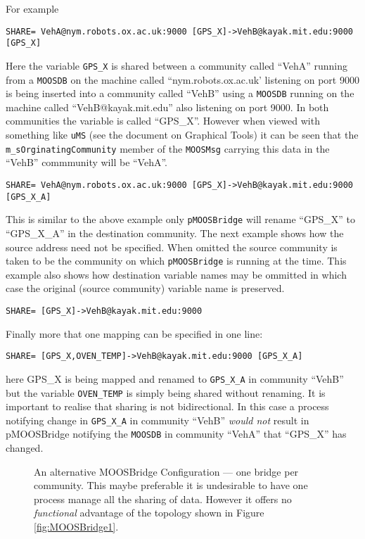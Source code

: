 \documentclass[a4paper,10pt]{article}
\newcommand{\Code}[1]{\texttt{#1} }
\newcommand{\code}[1]{\Code{#1} }
\newcommand{\DB}   {\code{{MOOSDB}}}
\begin{document}
For example\\
\begin{verbatim}
SHARE= VehA@nym.robots.ox.ac.uk:9000 [GPS_X]->VehB@kayak.mit.edu:9000 [GPS_X]
\end{verbatim}
Here the variable \code{GPS\_X} is shared between a community called ``VehA'' running from a \DB on the machine called
``nym.robots.ox.ac.uk' listening on port 9000 is being inserted into a community called ``VehB'' using a \DB running on the machine called
``VehB@kayak.mit.edu'' also listening on port 9000. In both communities the variable is called ``GPS\_X''. However when viewed with
something like \code{uMS} (see the document on Graphical Tools) it can be seen that the \code{m\_sOrginatingCommunity} member of the \code{MOOSMsg}
carrying this data in the ``VehB'' commmunity will be ``VehA''.

\begin{verbatim}
SHARE= VehA@nym.robots.ox.ac.uk:9000 [GPS_X]->VehB@kayak.mit.edu:9000 [GPS_X_A]
\end{verbatim}
This is similar to the above example only \code{pMOOSBridge} will rename ``GPS\_X'' to ``GPS\_X\_A'' in the
destination community. The next example shows how the source address need not be specified. When omitted the source community is
taken to be the community on which \code{pMOOSBridge} is running at the time. This example also shows how destination variable names may be ommitted in
which case the original (source community) variable name is preserved.
\begin{verbatim}
SHARE= [GPS_X]->VehB@kayak.mit.edu:9000
\end{verbatim}
Finally more that one mapping can be specified in one line:
\begin{verbatim}
SHARE= [GPS_X,OVEN_TEMP]->VehB@kayak.mit.edu:9000 [GPS_X_A]
\end{verbatim}
here GPS\_X is being mapped and renamed to \code{GPS\_X\_A} in community ``VehB'' but the variable \code{OVEN\_TEMP} is simply being shared without renaming.
It is important to realise that sharing is not bidirectional. In this case a process notifying change in \code{GPS\_X\_A} in community ``VehB'' \emph{would not}
result in pMOOSBridge notifying the \DB in community ``VehA'' that ``GPS\_X'' has changed.


\begin{figure}[ht]
\centering {} \caption{An alternative MOOSBridge Configuration
--- one bridge per community. This maybe preferable it is undesirable to have one process manage all
the sharing of data. However it offers no \emph{functional} advantage of the topology shown in Figure
\ref{fig:MOOSBridge1}.}\label{fig:MOOSBridge2}
\end{figure}
\end{document}
